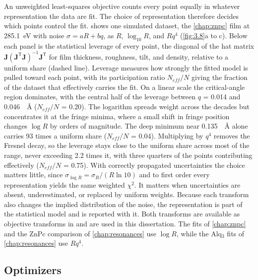 An unweighted least-squares objective counts every point equally in whatever representation the data are fit. The choice of representation therefore decides which points control the fit.  shows one simulated dataset, the \cref{chap:znpc} film at \qty{285.1}{eV} with noise \(\sigma = aR + bq\), as \(R\), \(\log_{10}R\), and \(Rq^{4}\) (\cref{fig:3.8}a to c). Below each panel is the statistical leverage of every point, the diagonal of the hat matrix \(\mathbf{J}\left( \mathbf{J}^{\mathsf{T}}\mathbf{J} \right)^{- 1}\mathbf{J}^{\mathsf{T}}\) for film thickness, roughness, tilt, and density, relative to a uniform share (dashed line). Leverage measures how strongly the fitted model is pulled toward each point, with its participation ratio \(N_{eff}/N\) giving the fraction of the dataset that effectively carries the fit. On a linear scale the critical-angle region dominates, with the central half of the leverage between \(q\) = 0.014 and \qty{0.046}{\per\angstrom} (\(N_{eff}/N\) = 0.20). The logarithm spreads weight across the decades but concentrates it at the fringe minima, where a small shift in fringe position changes \(\log R\) by orders of magnitude. The deep minimum near \qty{0.135}{\per\angstrom} alone carries 93 times a uniform share (\(N_{eff}/N\) = 0.04). Multiplying by \(q^{4}\) removes the Fresnel decay, so the leverage stays close to the uniform share across most of the range, never exceeding 2.2 times it, with three quarters of the points contributing effectively (\(N_{eff}/N\) = 0.75). With correctly propagated uncertainties the choice matters little, since \(\sigma_{\log R} = \sigma_{R}/\left( R\ln 10 \right)\) and to first order every representation yields the same weighted \(\chi^{2}\). It matters when uncertainties are absent, underestimated, or replaced by uniform weights. Because each transform also changes the implied distribution of the noise, the representation is part of the statistical model and is reported with it. Both transforms are available as objective transforms in \autocite{nelsonRefnxNeutronXray2019} and are used in this dissertation. The fits of \cref{chap:znpc} and the ZnPc comparison of \cref{chap:resonances} use \(\log R\), while the Alq\(_{3}\) fits of \cref{chap:resonances} use \(Rq^{4}\).

\subsection{Optimizers}\label{sec:optimizers}

